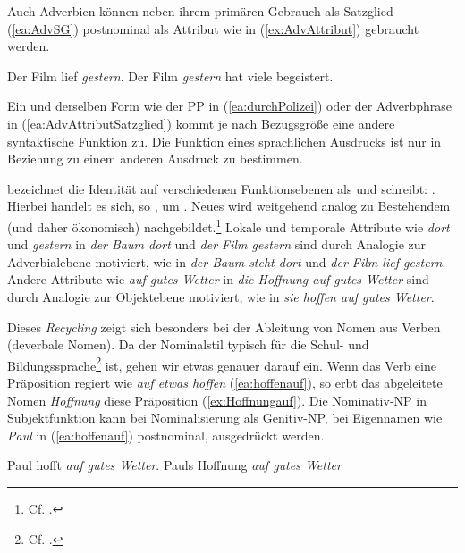 Auch Adverbien können neben ihrem primären Gebrauch als Satzglied (\ref{ea:AdvSG}) postnominal als Attribut wie in (\ref{ex:AdvAttribut}) gebraucht werden. 

\ea \label{ea:AdvAttributSatzglied}
\ea \label{ea:AdvSG} Der Film lief \textit{gestern}.
\ex \label{ex:AdvAttribut} Der Film \textit{gestern} hat viele begeistert.
\z 
\z 

Ein und derselben Form wie der PP in (\ref{ea:durchPolizei}) oder der Adverbphrase in (\ref{ea:AdvAttributSatzglied}) kommt je nach Bezugsgröße eine andere syntaktische Funktion zu. Die Funktion eines sprachlichen Ausdrucks ist nur in Beziehung zu einem anderen Ausdruck zu bestimmen.    

\citet[35, 55]{Agel2017} bezeichnet die Identität auf verschiedenen Funktionsebenen als  und schreibt: . Hierbei handelt es sich, so \citet[751]{Agel2017}, um . Neues wird weitgehend analog zu Bestehendem (und daher ökonomisch) nachgebildet.\footnote{Cf. \citet[295]{Langacker1991}.} Lokale und temporale Attribute wie \textit{dort} und \textit{gestern} in \textit{der Baum dort} und \textit{der Film gestern} sind durch Analogie zur Adverbialebene motiviert, wie in \textit{der Baum steht dort} und \textit{der Film lief gestern}. Andere Attribute wie \textit{auf gutes Wetter} in \textit{die Hoffnung auf gutes Wetter} sind durch Analogie zur Objektebene motiviert, wie in \textit{sie hoffen auf gutes Wetter}.

Dieses \textit{Recycling} zeigt sich besonders bei der Ableitung von Nomen aus Verben (deverbale Nomen). Da der Nominalstil typisch für die Schul- und Bildungssprache\footnote{Cf. \citet[489--490]{GogolinDuarte2016}.} ist, gehen wir etwas genauer darauf ein. Wenn das Verb eine Präposition regiert wie \textit{auf etwas hoffen} (\ref{ea:hoffenauf}), so erbt das abgeleitete Nomen \textit{Hoffnung} diese Präposition (\ref{ex:Hoffnungauf}). Die Nominativ-NP in Subjektfunktion kann bei Nominalisierung als Genitiv-NP, bei Eigennamen wie \textit{Paul} in (\ref{ea:hoffenauf}) postnominal, ausgedrückt werden.

\ea \label{ea:Nominalisierung}
\ea \label{ea:hoffenauf} Paul hofft \textit{auf gutes Wetter}.
\ex \label{ex:Hoffnungauf} Pauls Hoffnung \textit{auf gutes Wetter}
\z 
\z 

